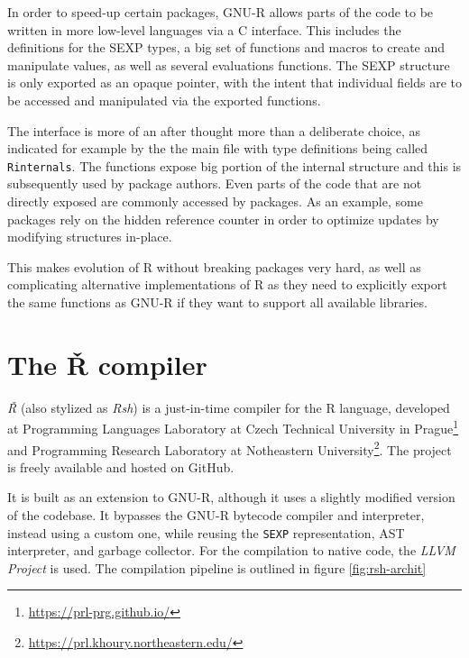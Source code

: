 In order to speed-up certain packages, GNU-R allows parts of the code to be written in more low-level languages via a C interface. This includes the definitions for the SEXP types, a big set of functions and macros to create and manipulate values, as well as several evaluations functions. The SEXP structure is only exported as an opaque pointer, with the intent that individual fields are to be accessed and manipulated via the exported functions.

The interface is more of an after thought more than a deliberate choice, as indicated for example by the the main file with type definitions being called \texttt{Rinternals}. The functions expose big portion of the internal structure and this is subsequently used by package authors. Even parts of the code that are not directly exposed are commonly accessed by packages. As an example, some packages rely on the hidden reference counter in order to optimize updates by modifying structures in-place.

This makes evolution of R without breaking packages very hard, as well as complicating alternative implementations of R as they need to explicitly export the same functions as GNU-R if they want to support all available libraries.

\newpage
\section{The Ř compiler}

\textit{Ř} (also stylized as \textit{Rsh}) is a just-in-time compiler for the R language, developed at Programming Languages Laboratory at Czech Technical University in Prague\footnote{\url{https://prl-prg.github.io/}} and Programming Research Laboratory at Notheastern University\footnote{\url{https://prl.khoury.northeastern.edu/}}. The project is freely available and hosted on GitHub\cite{rsh-github}.

It is built as an extension to GNU-R, although it uses a slightly modified version of the codebase. It bypasses the GNU-R bytecode compiler and interpreter, instead using a custom one, while reusing the \texttt{SEXP} representation, AST interpreter, and garbage collector. For the compilation to native code, the \textit{LLVM Project}\cite{llvm} is used. The compilation pipeline is outlined in figure \ref{fig:rsh-archit}

